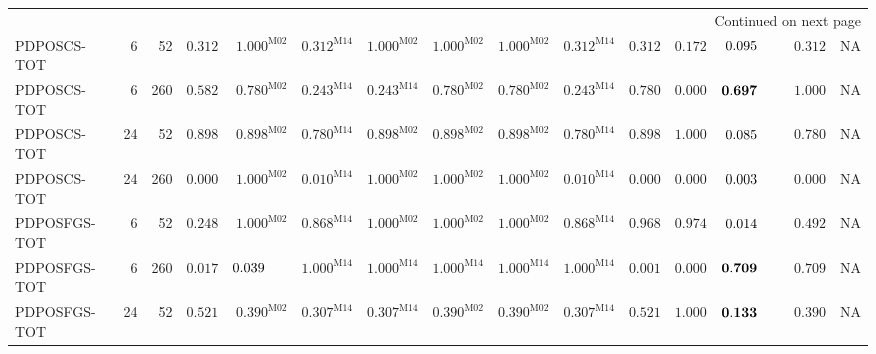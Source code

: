 \documentclass[10pt,a4paper]{article}
\begin{document}
\begin{longtable}{@{}lrrrrrrrrrrrrrr@{}}
\midrule
\endhead
\midrule\multicolumn{15}{r}{Continued on next page}\\\endfoot
\bottomrule\endlastfoot
PDPOSCS-TOT & 6 & 52 & $\mathbf{0.312}$ & $\mathbf{1.000}^{\mathrm{M02}}$ & $\mathbf{0.312}^{\mathrm{M14}}$ & $\mathbf{1.000}^{\mathrm{M02}}$ & $\mathbf{1.000}^{\mathrm{M02}}$ & $\mathbf{1.000}^{\mathrm{M02}}$ & $\mathbf{0.312}^{\mathrm{M14}}$ & $\mathbf{0.312}$ & $\mathbf{0.172}$ & $0.095\hphantom{^{\mathrm{M00}}}$ & $\mathbf{0.312}$ & \textsc{NA} \\
PDPOSCS-TOT & 6 & 260 & $\mathbf{0.582}$ & $\mathbf{0.780}^{\mathrm{M02}}$ & $\mathbf{0.243}^{\mathrm{M14}}$ & $\mathbf{0.243}^{\mathrm{M14}}$ & $\mathbf{0.780}^{\mathrm{M02}}$ & $\mathbf{0.780}^{\mathrm{M02}}$ & $\mathbf{0.243}^{\mathrm{M14}}$ & $\mathbf{0.780}$ & $0.000$ & $\mathbf{0.697}\hphantom{^{\mathrm{M00}}}$ & $\mathbf{1.000}$ & \textsc{NA} \\
PDPOSCS-TOT & 24 & 52 & $\mathbf{0.898}$ & $\mathbf{0.898}^{\mathrm{M02}}$ & $\mathbf{0.780}^{\mathrm{M14}}$ & $\mathbf{0.898}^{\mathrm{M02}}$ & $\mathbf{0.898}^{\mathrm{M02}}$ & $\mathbf{0.898}^{\mathrm{M02}}$ & $\mathbf{0.780}^{\mathrm{M14}}$ & $\mathbf{0.898}$ & $\mathbf{1.000}$ & $0.085\hphantom{^{\mathrm{M00}}}$ & $\mathbf{0.780}$ & \textsc{NA} \\
PDPOSCS-TOT & 24 & 260 & $0.000$ & $\mathbf{1.000}^{\mathrm{M02}}$ & $0.010^{\mathrm{M14}}$ & $\mathbf{1.000}^{\mathrm{M02}}$ & $\mathbf{1.000}^{\mathrm{M02}}$ & $\mathbf{1.000}^{\mathrm{M02}}$ & $0.010^{\mathrm{M14}}$ & $0.000$ & $0.000$ & $0.003\hphantom{^{\mathrm{M00}}}$ & $0.000$ & \textsc{NA} \\
PDPOSFGS-TOT & 6 & 52 & $\mathbf{0.248}$ & $\mathbf{1.000}^{\mathrm{M02}}$ & $\mathbf{0.868}^{\mathrm{M14}}$ & $\mathbf{1.000}^{\mathrm{M02}}$ & $\mathbf{1.000}^{\mathrm{M02}}$ & $\mathbf{1.000}^{\mathrm{M02}}$ & $\mathbf{0.868}^{\mathrm{M14}}$ & $\mathbf{0.968}$ & $\mathbf{0.974}$ & $0.014\hphantom{^{\mathrm{M00}}}$ & $\mathbf{0.492}$ & \textsc{NA} \\
PDPOSFGS-TOT & 6 & 260 & $0.017$ & $0.039\hphantom{^{\mathrm{M00}}}$ & $\mathbf{1.000}^{\mathrm{M14}}$ & $\mathbf{1.000}^{\mathrm{M14}}$ & $\mathbf{1.000}^{\mathrm{M14}}$ & $\mathbf{1.000}^{\mathrm{M14}}$ & $\mathbf{1.000}^{\mathrm{M14}}$ & $0.001$ & $0.000$ & $\mathbf{0.709}\hphantom{^{\mathrm{M00}}}$ & $\mathbf{0.709}$ & \textsc{NA} \\
PDPOSFGS-TOT & 24 & 52 & $\mathbf{0.521}$ & $\mathbf{0.390}^{\mathrm{M02}}$ & $\mathbf{0.307}^{\mathrm{M14}}$ & $\mathbf{0.307}^{\mathrm{M14}}$ & $\mathbf{0.390}^{\mathrm{M02}}$ & $\mathbf{0.390}^{\mathrm{M02}}$ & $\mathbf{0.307}^{\mathrm{M14}}$ & $\mathbf{0.521}$ & $\mathbf{1.000}$ & $\mathbf{0.133}\hphantom{^{\mathrm{M00}}}$ & $\mathbf{0.390}$ & \textsc{NA} \\

\end{longtable}
\end{document}
